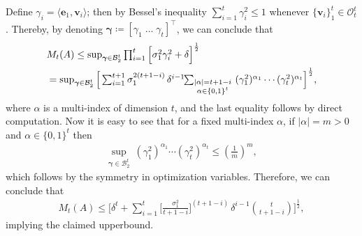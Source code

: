 \documentclass[journal]{IEEEtran}
\theoremstyle{definition}
\theoremstyle{remark}
\def\v{{\bm v}}
\newcommand \e{{\bm e}}
\newcommand\ogamma{{\bm \gamma}}
\begin{document}
		Define $\gamma_i =  \langle \e_1, \v_i \rangle$; then by Bessel's inequality $\sum_{i=1}^t \gamma_i^2 \leq 1$ whenever $\{\v_i\}_1^t\in \mathcal{O}_t^t$. Thereby, by denoting $\ogamma \coloneqq [
		\gamma_1 \;
		\hdots \; \gamma_t
		]^\intercal$, we can conclude that
		\begin{gather*}
		\begin{aligned}
		& M_t(A) \leq \textstyle \sup_{\ogamma \in \mathcal{B}_{2}^t} \prod_{i=1}^t \Big[ \sigma_1^2 \gamma_i^2 + \delta \Big]^{\frac{1}{2}}\\
		&\textstyle = \sup_{\ogamma \in \mathcal{B}_{2}^t} \Big[ \sum_{i=1}^{t+1} \sigma_1^{2(t+1-i)} \, \delta^{i-1} \hspace{-1mm} \sum_{\substack{|\alpha| = t+1-i\\ \alpha \in \{0,1\}^t}~} (\gamma_1^2)^{\alpha_1} \cdots (\gamma_t^2)^{\alpha_t} \Big]^{\frac{1}{2}},
		\end{aligned}
		\end{gather*}
		where $\alpha$ is a multi-index of dimension $t$, and the last equality follows by direct computation.
		Now it is easy to see that for a fixed multi-index $\alpha$, if $|\alpha| =m > 0$ and $\alpha \in \{0,1\}^t$ then
		\begin{align*}
		\textstyle
		\sup_{\ogamma \in \mathcal{B}_{2}^t}~ (\gamma_1^2)^{\alpha_1} \cdots (\gamma_t^2)^{\alpha_t} \leq (\frac{1}{m})^m ,
		\end{align*}
        which follows by the symmetry in optimization variables.
		Therefore, we can conclude that
		\begin{gather*}
		\textstyle 
		M_t(A) \leq \Big[ \delta^t + \sum_{i=1}^{t} \big[\frac{\sigma_1^2}{t+1-i}\big]^{(t+1-i)} \, \delta^{i-1} \binom{t}{t+1-i} \Big]^{\frac{1}{2}},
		\end{gather*}
		implying the claimed upperbound.




\vspace{-0.3cm}
\end{document}
